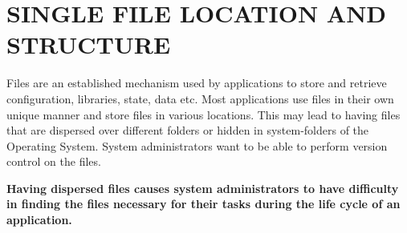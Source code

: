 \newpage
\section*{SINGLE FILE LOCATION AND STRUCTURE}
Files are an established mechanism used by applications to store and
retrieve configuration, libraries, state, data etc. Most applications use files in their own unique manner and store files in various locations. This may lead to having files that are dispersed over different folders or hidden in system-folders of the Operating System. System administrators  want to be able to perform version control on the files.
\begin{center}
  
\end{center}

\textbf{Having dispersed files causes system administrators to have difficulty in finding the files necessary for their tasks during the life cycle of an application.}\\

